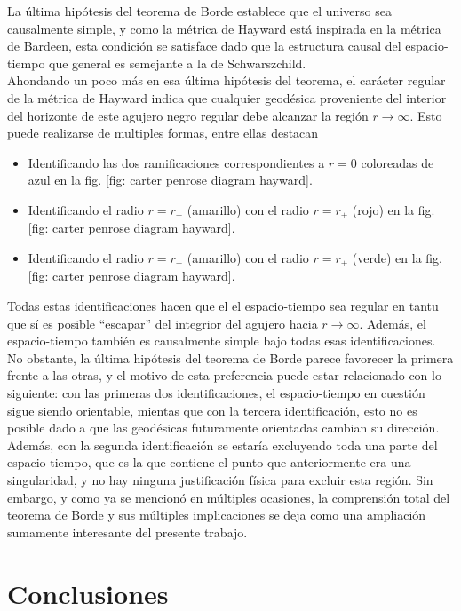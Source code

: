 \documentclass[16pt,a4paper]{article}
\numberwithin{equation}{section}
\theoremstyle{definition}
\begin{document}
La última hipótesis del teorema de Borde establece que el universo sea causalmente simple, y como la métrica de Hayward está inspirada en la métrica de Bardeen, esta condición se satisface dado que la estructura causal del espacio-tiempo que general es semejante a la de Schwarszchild.\\

Ahondando un poco más en esa última hipótesis del teorema, el carácter regular de la métrica de Hayward indica que cualquier geodésica proveniente del interior del horizonte de este agujero negro regular debe alcanzar la región $r \to \infty$. Esto puede realizarse de multiples formas, entre ellas destacan

\begin{itemize}
\item Identificando las dos ramificaciones correspondientes a $r = 0$ coloreadas de azul en la fig. \ref{fig: carter penrose diagram hayward}.

\item Identificando el radio $r = r_-$ (amarillo) con el radio $r = r_+$ (rojo) en la fig. \ref{fig: carter penrose diagram hayward}. 

\item Identificando el radio $r = r_-$ (amarillo) con el radio $r = r_+$ (verde) en la fig. \ref{fig: carter penrose diagram hayward}.
\end{itemize}

Todas estas identificaciones hacen que el el espacio-tiempo sea regular en tantu que sí es posible ``escapar'' del integrior del agujero hacia $r \to \infty$. Además, el espacio-tiempo también es causalmente simple bajo todas esas identificaciones. No obstante, la última hipótesis del teorema de Borde parece favorecer la primera frente a las otras, y el motivo de esta preferencia puede estar relacionado con lo siguiente: con las primeras dos identificaciones, el espacio-tiempo en cuestión sigue siendo orientable, mientas que con la tercera identificación, esto no es posible dado a que las geodésicas  futuramente orientadas cambian su dirección. Además, con la segunda identificación se estaría excluyendo toda una parte del espacio-tiempo, que es la que contiene el punto que anteriormente era una singularidad, y no hay ninguna justificación física para excluir esta región. Sin embargo, y como ya se mencionó en múltiples ocasiones, la comprensión total del teorema de Borde y sus múltiples implicaciones se deja como una ampliación sumamente interesante del presente trabajo.
\newpage
\section{\label{conclusions} Conclusiones}
\end{document}

